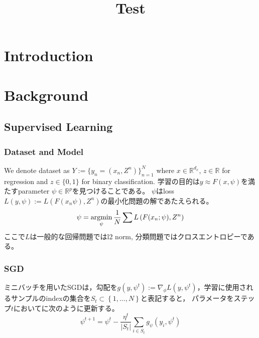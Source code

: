 \documentclass{article}
\title{Test}
\author{}
\begin{document}
\listoftodos

\maketitle

\begin{abstract}
\end{abstract}

\section{Introduction}

\section{Background}
    \label{prior}
    \subsection{Supervised Learning}
        \subsubsection{Dataset and Model}
            We denote dataset as \(Y:= \{y_n = \left(  x_n , Z^n  \right)\} ^{N}_{n=1} \)
            where \(x \in \mathbb{R}^{d_x}\), \(z \in \mathbb{R}\)  for regression and \(z \in  \{ 0,1 \}\) for binary classification.
            学習の目的は\( y \approx F \left( x, \psi \right) \)を満たすparameter \(\psi \in \mathbb{R}^{p}\)を見つけることである。
            \(\psi\)はloss \(L \left( y, \psi \right) := L \left( F(x_n \psi) ,Z^{n} \right)\)の最小化問題の解であたえられる。
            \begin{equation}
                \psi = \mathop{\rm argmin}\limits_{ \psi }\frac{1}{N} \sum L \left( F(x_n;\psi) ,Z^{n} \right)
            \end{equation}
            ここで\(L\)は一般的な回帰問題ではl2 norm, 分類問題ではクロスエントロピーである。
            
          \subsubsection{SGD}
            ミニバッチを用いたSGDは，勾配を\( g \left( y, \psi ^{t} \right) := \nabla _{ \phi }L \left( y, \psi ^{t} \right) \)，学習に使用されるサンプルのindexの集合を\(S_t \subset  \left\{ 1,  \ldots , N \right\}\)と表記すると，
            パラメータをステップ\(t\)においてに次のように更新する。    
            \begin{equation}
                \psi ^{t+1} 
                = \psi ^{t} 
                -\frac{\eta^{t}}{ \vert S_{t} \vert }  \sum _{i \in S_{t}}g_\psi\left( y_{i},\psi^{t}\right)
            \end{equation}
\end{document}
